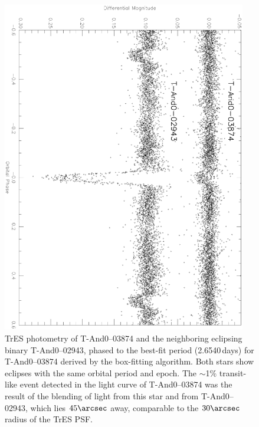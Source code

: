 \begin{figure}
\begin{center}
\includegraphics[angle=90, width=0.95\textwidth]{2_f7}
\caption[TrES photometry of \mbox{T-And0--03874} and the neighboring binary]{TrES photometry of \mbox{T-And0--03874} and the neighboring eclipsing binary \mbox{T-And0--02943}, phased to the best-fit period (2.6540\,days) for \mbox{T-And0--03874} derived by the box-fitting algorithm. Both stars show eclipses with the same orbital period and epoch. The $\sim$1\% transit-like event detected in the light curve of \mbox{T-And0--03874} was the result of the blending of light from this star and from \mbox{T-And0--02943}, which lies $45\arcsec$ away, comparable to the $30\arcsec$ radius of the TrES PSF.}\label{cha:and0:fig:compblend}
\end{center}
\end{figure}

